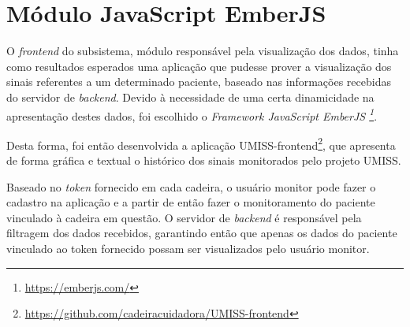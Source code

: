\section{Módulo JavaScript EmberJS}

O \textit{frontend} do subsistema, módulo responsável pela visualização dos
dados, tinha como resultados esperados uma aplicação que pudesse prover a
visualização dos sinais referentes a um determinado paciente, baseado nas
informações recebidas do servidor de \textit{backend}. Devido à necessidade de
uma certa dinamicidade na apresentação destes dados, foi escolhido o
\textit{Framework JavaScript EmberJS \footnote{\url{https://emberjs.com/}}}.

Desta forma, foi então desenvolvida a aplicação
UMISS-frontend\footnote{\url{https://github.com/cadeiracuidadora/UMISS-frontend}},
que apresenta de forma gráfica e textual o histórico dos sinais monitorados pelo
projeto UMISS.

Baseado no \textit{token} fornecido em cada cadeira, o usuário monitor pode
fazer o cadastro na aplicação e a partir de então fazer o monitoramento do
paciente vinculado à cadeira em questão. O servidor de \textit{backend} é
responsável pela filtragem dos dados recebidos, garantindo então que apenas os
dados do paciente vinculado ao token fornecido possam ser visualizados pelo
usuário monitor.

